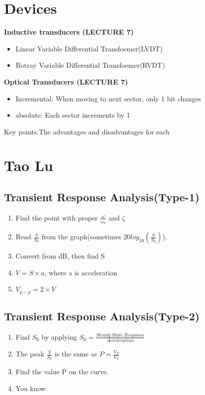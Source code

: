 \documentclass{article}
\begin{document}
	\section{Devices}
	\textbf{Inductive transducers (LECTURE 7)}
	\begin{itemize}
		\item Linear Variable Differential Transfoemer(LVDT)
		\item Rotray Variable Differential Transfoemer(RVDT)
	\end{itemize}
	
	\textbf{Optical Transducers (LECTURE 7)}
	
	\begin{itemize}
		\item Incremental: When moving to next sector, only 1 bit changes
		\item absolute: Each sector increments by 1
	\end{itemize}
	\noindent Key points:The advantages and disadvantages for each
	\section{Tao Lu}
	\subsection{Transient Response Analysis(Type-1)}
	\begin{enumerate}
		\item Find the point with proper $\frac{\omega}{\omega_n}$ and $\zeta$
		\item Read $\frac{S}{S_0}$ from the graph(sometimes $20log_{10}(\frac{S}{S_0})$).
		\item Convert from dB, then find S
		\item $V = S \times a$, where a is acceleration
		\item $V_{p-p} = 2\times V$
	\end{enumerate}  
	
		\subsection{Transient Response Analysis(Type-2)}
	\begin{enumerate}
	
	 \item Find $S_0$ by applying $S_0 = \frac{Steady\ State\ Response}{Acceleration}$
	 \item The peak $\frac{S}{S_0}$ is the same as $P = \frac{V_P}{V_S}$
	 \item Find  the value P on the curve.
	 \item You know.
	\end{enumerate}
	
\end{document}
